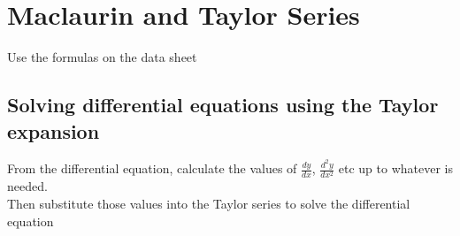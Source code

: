 \documentclass{article}[18pt]
\begin{document}
\section{Maclaurin and Taylor Series}
Use the formulas on the data sheet
\subsection{Solving differential equations using the Taylor expansion}
From the differential equation, calculate the values of $\frac{dy}{dx}$, $\frac{d^2y}{dx^2}$ etc up to whatever is needed.\\
Then substitute those values into the Taylor series to solve the differential equation
\end{document}
